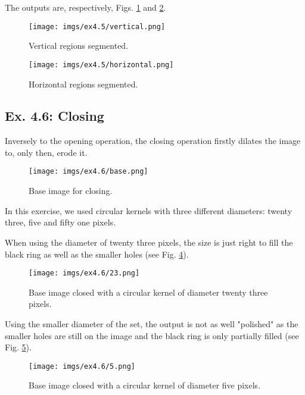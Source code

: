 \documentclass[journal]{IEEEtran}
\begin{document}
The outputs are, respectively, Figs. \ref{fig:4.5_vertical} and \ref{fig:4.5_horizontal}.

\begin{figure}[htp]
  \centering
  \texttt{[image: imgs/ex4.5/vertical.png]}
  \caption{Vertical regions segmented.}
  \label{fig:4.5_vertical}
\end{figure}
\FloatBarrier

\begin{figure}[htp]
  \centering
  \texttt{[image: imgs/ex4.5/horizontal.png]}
  \caption{Horizontal regions segmented.}
  \label{fig:4.5_horizontal}
\end{figure}
\FloatBarrier

\subsection{Ex. 4.6: Closing}

Inversely to the opening operation, the closing operation firstly dilates the image to, only then, erode it.

\begin{figure}[htp]
  \centering
  \texttt{[image: imgs/ex4.6/base.png]}
  \caption{Base image for closing.}
  \label{fig:4.6_base}
\end{figure}
\FloatBarrier

In this exercise, we used circular kernels with three different diameters: twenty three, five and fifty one pixels. 

When using the diameter of twenty three pixels, the size is just right to fill the black ring as well as the smaller holes (see Fig. \ref{fig:4.6_23}).

\begin{figure}[htp]
  \centering
  \texttt{[image: imgs/ex4.6/23.png]}
  \caption{Base image closed with a circular kernel of diameter twenty three pixels.}
  \label{fig:4.6_23}
\end{figure}
\FloatBarrier

Using the smaller diameter of the set, the output is not as well "polished" as the smaller holes are still on the image and the black ring is only partially filled (see Fig. \ref{fig:4.6_5}).

\begin{figure}[htp]
  \centering
  \texttt{[image: imgs/ex4.6/5.png]}
  \caption{Base image closed with a circular kernel of diameter five pixels.}
  \label{fig:4.6_5}
\end{figure}
\FloatBarrier
\end{document}
